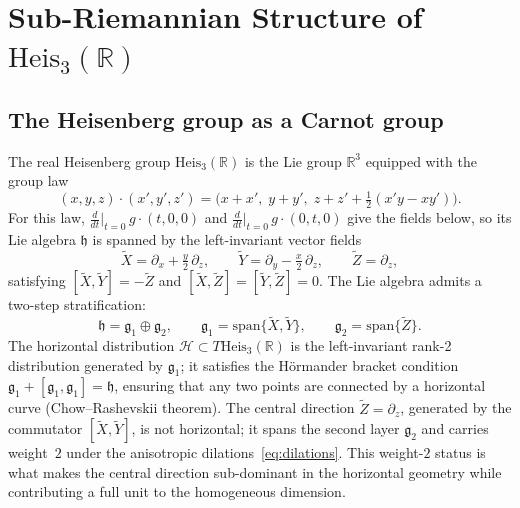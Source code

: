 \documentclass[11pt,a4paper]{article}
\theoremstyle{definition}
\theoremstyle{remark}
\newcommand{\HeisR}{\mathrm{Heis}_3(\mathbb{R})}
\begin{document}
  \section{\texorpdfstring{Sub-Riemannian Structure of $\HeisR$}{Sub-Riemannian Structure of Heis3(R)}}
  \label{sec:heis}

  \subsection{The Heisenberg group as a Carnot group}

    The real Heisenberg group $\HeisR$ is the Lie group $\mathbb{R}^3$ equipped with the
    group law
    \begin{equation}
      (x,y,z) \cdot (x',y',z') = \bigl(x+x',\; y+y',\; z + z' + \tfrac{1}{2}(x'y - xy')\bigr).
      \label{eq:heis-law}
    \end{equation}
    For this law, $\frac{d}{dt}\big|_{t=0}\, g\cdot(t,0,0)$ and $\frac{d}{dt}\big|_{t=0}\, g\cdot(0,t,0)$ give the
    fields below, so its Lie algebra $\mathfrak{h}$ is spanned by the left-invariant vector fields
    \begin{equation}
      \tilde X = \partial_x + \tfrac{y}{2}\,\partial_z, \qquad
      \tilde Y = \partial_y - \tfrac{x}{2}\,\partial_z, \qquad
      \tilde Z = \partial_z,
      \label{eq:generators}
    \end{equation}
    satisfying $[\tilde X, \tilde Y] = -\tilde Z$ and $[\tilde X, \tilde Z] =
  [\tilde Y, \tilde Z] = 0$.
    The Lie algebra admits a two-step stratification:
    \begin{equation}
      \mathfrak{h} = \mathfrak{g}_1 \oplus \mathfrak{g}_2, \qquad
      \mathfrak{g}_1 = \mathrm{span}\{\tilde X, \tilde Y\}, \qquad \mathfrak{g}_2 =
      \mathrm{span}\{\tilde Z\}.
    \end{equation}
    The horizontal distribution $\mathcal{H} \subset T\HeisR$ is the left-invariant rank-2
    distribution generated by $\mathfrak{g}_1$; it satisfies the H\"{o}rmander bracket
    condition $\mathfrak{g}_1 + [\mathfrak{g}_1, \mathfrak{g}_1] = \mathfrak{h}$,
    ensuring that any two points are connected by a horizontal curve (Chow--Rashevskii
    theorem).
    The central direction $\tilde Z = \partial_z$, generated by the commutator $[\tilde X,
  \tilde Y]$, is not horizontal; it spans the second layer $\mathfrak{g}_2$ and carries
    weight~$2$ under the anisotropic dilations~\eqref{eq:dilations}.
    This weight-$2$ status is what makes the central direction sub-dominant in the horizontal
    geometry while contributing a full unit to the homogeneous dimension.
\end{document}
